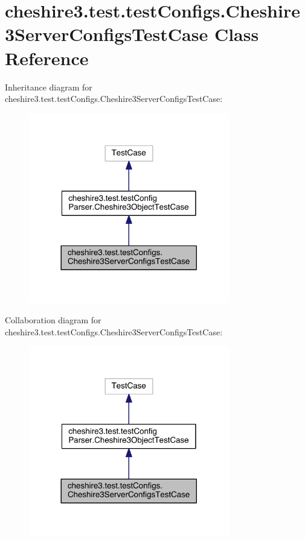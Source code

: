 \hypertarget{classcheshire3_1_1test_1_1test_configs_1_1_cheshire3_server_configs_test_case}{\section{cheshire3.\-test.\-test\-Configs.\-Cheshire3\-Server\-Configs\-Test\-Case Class Reference}
\label{classcheshire3_1_1test_1_1test_configs_1_1_cheshire3_server_configs_test_case}
}


Inheritance diagram for cheshire3.\-test.\-test\-Configs.\-Cheshire3\-Server\-Configs\-Test\-Case\-:
\nopagebreak
\begin{figure}[H]
\begin{center}
\leavevmode
\includegraphics[width=248pt]{classcheshire3_1_1test_1_1test_configs_1_1_cheshire3_server_configs_test_case__inherit__graph}
\end{center}
\end{figure}


Collaboration diagram for cheshire3.\-test.\-test\-Configs.\-Cheshire3\-Server\-Configs\-Test\-Case\-:
\nopagebreak
\begin{figure}[H]
\begin{center}
\leavevmode
\includegraphics[width=248pt]{classcheshire3_1_1test_1_1test_configs_1_1_cheshire3_server_configs_test_case__coll__graph}
\end{center}
\end{figure}
